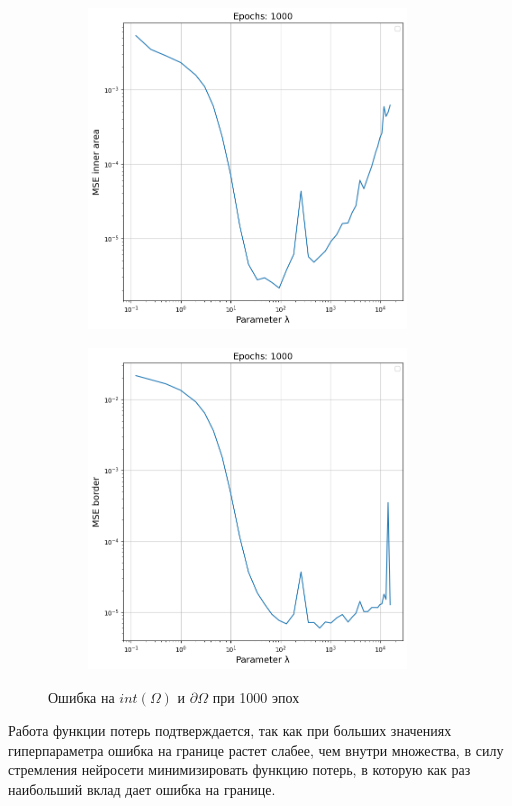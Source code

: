 \begin{figure}[ht!]
    \centering
    \begin{subfigure}{0.45\textwidth}{
        \includegraphics[height=8.5cm, keepaspectratio]{images/10.png}
    }
    \end{subfigure}
    \hfill
    \begin{subfigure}{0.45\textwidth}{
        \includegraphics[height=8.5cm, keepaspectratio]{images/11.png}
    }
    \end{subfigure}
    \caption{Ошибка на $int(\Omega)$ и $\partial \Omega$ при 1000 эпох}
\end{figure}

Работа функции потерь подтверждается, так как при больших значениях гиперпараметра ошибка на границе растет слабее, 
чем внутри множества, в силу стремления нейросети минимизировать функцию потерь, в которую как раз наибольший вклад дает 
ошибка на границе.

\newpage

